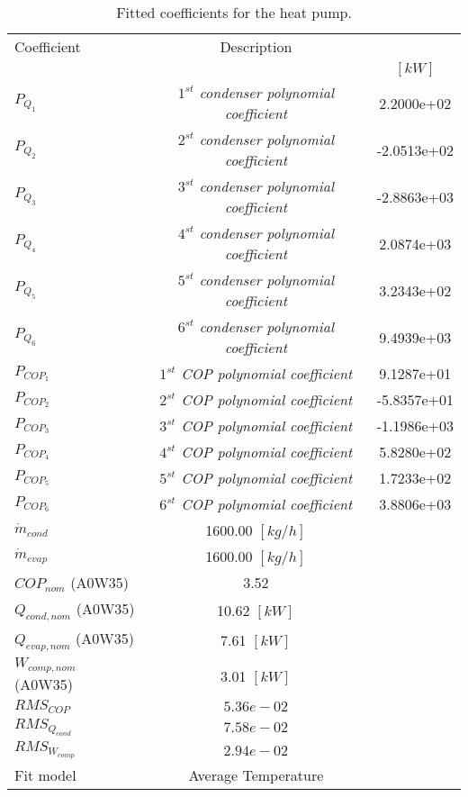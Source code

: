 \documentclass[english]{SPFShortReport}
\author{Dani Carbonell}
\begin{document}
\begin{table}[!ht]
\begin{small}
\caption{Fitted coefficients for the heat pump.}
\begin{center}
\resizebox{12cm}{!} 
{
\begin{tabular}{l | c c } 
\hline
\hline
Coefficient &Description & \\ 
 & &$[kW]$\\ 
\hline
$P_{Q_{1}}$ & \emph{$1^{st}$ condenser polynomial coefficient}  & 2.2000e+02    \\ 
$P_{Q_{2}}$ & \emph{$2^{st}$ condenser polynomial coefficient}  & -2.0513e+02    \\ 
$P_{Q_{3}}$ & \emph{$3^{st}$ condenser polynomial coefficient}  & -2.8863e+03    \\ 
$P_{Q_{4}}$ & \emph{$4^{st}$ condenser polynomial coefficient}  & 2.0874e+03    \\ 
$P_{Q_{5}}$ & \emph{$5^{st}$ condenser polynomial coefficient}  & 3.2343e+02    \\ 
$P_{Q_{6}}$ & \emph{$6^{st}$ condenser polynomial coefficient}  & 9.4939e+03    \\ 
\hline
$P_{COP_{1}}$ & \emph{$1^{st}$ COP polynomial coefficient}  & 9.1287e+01    \\ 
$P_{COP_{2}}$ & \emph{$2^{st}$ COP polynomial coefficient}  & -5.8357e+01    \\ 
$P_{COP_{3}}$ & \emph{$3^{st}$ COP polynomial coefficient}  & -1.1986e+03    \\ 
$P_{COP_{4}}$ & \emph{$4^{st}$ COP polynomial coefficient}  & 5.8280e+02    \\ 
$P_{COP_{5}}$ & \emph{$5^{st}$ COP polynomial coefficient}  & 1.7233e+02    \\ 
$P_{COP_{6}}$ & \emph{$6^{st}$ COP polynomial coefficient}  & 3.8806e+03    \\ 
\hline
$\dot m_{cond}$ & 1600.00 $[kg/h]$ \\ 
$\dot m_{evap}$ & 1600.00 $[kg/h]$ \\ 
\hline
$COP_{nom}$ (A0W35)& 3.52 \\ 
$Q_{cond,nom}$ (A0W35)& 10.62 $[kW]$\\ 
$Q_{evap,nom}$ (A0W35)& 7.61 $[kW]$\\ 
$W_{comp,nom}$ (A0W35)& 3.01 $[kW]$\\ 
\hline
 $RMS_{COP}$ & $5.36e-02$ \\ 
 $RMS_{Q_{cond}}$ & $7.58e-02$ \\ 
 $RMS_{W_{comp}}$ & $2.94e-02$ \\ 
\hline
Fit model & Average Temperature\\ 
\hline
\hline
\end{tabular}
}
\label{CoefTable}
\end{center}
\end{small}
\end{table}
\end{document}
